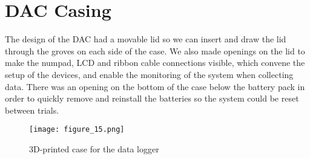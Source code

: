 \section{DAC Casing}
The design of the DAC had a movable lid so we can insert and draw the lid through the groves on each side of the case.
We also made openings on the lid to make the numpad, LCD and ribbon cable connections visible, which convene the setup of the devices, and enable the monitoring of the system when collecting data.
There was an opening on the bottom of the case below the battery pack in order to quickly remove and reinstall the batteries so the system could be reset between trials.
\begin{figure}
  \centering
  \texttt{[image: figure\_15.png]}
  \caption[3D-printed case]{3D-printed case for the data logger}
  \label{fig:x 3d print}
\end{figure}
